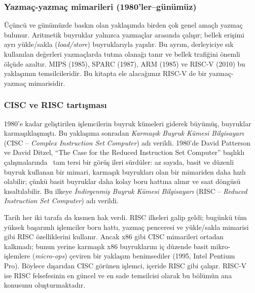 \subsubsection*{Yazmaç-yazmaç mimarileri (1980'ler--günümüz)}
Üçüncü ve günümüzde baskın olan yaklaşımda birden çok genel amaçlı yazmaç bulunur. Aritmetik buyruklar yalnızca yazmaçlar arasında çalışır; bellek erişimi ayrı yükle/sakla (\emph{load/store}) buyruklarıyla yapılır. Bu ayrım, derleyiciye sık kullanılan değerleri yazmaçlarda tutma olanağı tanır ve bellek trafiğini önemli ölçüde azaltır. MIPS (1985), SPARC (1987), ARM (1985) ve RISC-V (2010) bu yaklaşımın temsilcileridir. Bu kitapta ele alacağımız RISC-V de bir yazmaç-yazmaç mimarisidir.

\subsubsection*{CISC ve RISC tartışması}
1980'e kadar geliştirilen işlemcilerin buyruk kümeleri giderek büyümüş, buyruklar karmaşıklaşmıştı. Bu yaklaşıma sonradan \emph{Karmaşık Buyruk Kümesi Bilgisayarı} (CISC -- \emph{Complex Instruction Set Computer}) adı verildi. 1980'de David Patterson ve David Ditzel, ``The Case for the Reduced Instruction Set Computer'' başlıklı çalışmalarında~\cite{patterson1980} tam tersi bir görüş ileri sürdüler: az sayıda, basit ve düzenli buyruk kullanan bir mimari, karmaşık buyrukları olan bir mimariden daha hızlı olabilir; çünkü basit buyruklar daha kolay boru hattına alınır ve saat döngüsü kısaltılabilir. Bu ilkeye \emph{İndirgenmiş Buyruk Kümesi Bilgisayarı} (RISC -- \emph{Reduced Instruction Set Computer}) adı verildi.

Tarih her iki tarafa da kısmen hak verdi. RISC ilkeleri galip geldi; bugünkü tüm yüksek başarımlı işlemciler boru hattı, yazmaç penceresi ve yükle/sakla mimarisi gibi RISC özelliklerini kullanır. Ancak x86 gibi CISC mimarileri ortadan kalkmadı; bunun yerine karmaşık x86 buyruklarını iç düzende basit mikro-işlemlere (\emph{micro-ops}) çeviren bir yaklaşım benimsediler (1995, Intel Pentium Pro). Böylece dışarıdan CISC görünen işlemci, içeride RISC gibi çalışır. RISC-V ise RISC felsefesinin en güncel ve en sade temsilcisi olarak bu bölümün ana konusunu oluşturmaktadır.

